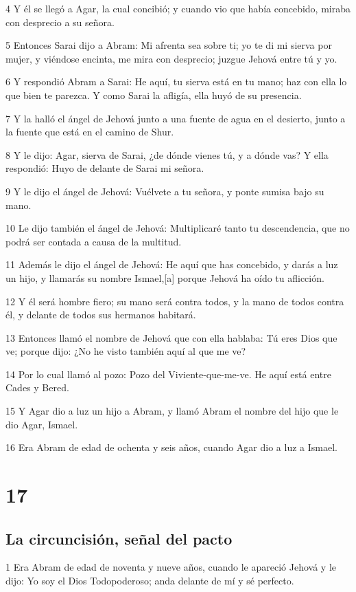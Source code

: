 4 Y él se llegó a Agar, la cual concibió; y cuando vio que había concebido, miraba con desprecio a su señora.

5 Entonces Sarai dijo a Abram: Mi afrenta sea sobre ti; yo te di mi sierva por mujer, y viéndose encinta, me mira con desprecio; juzgue Jehová entre tú y yo.

6 Y respondió Abram a Sarai: He aquí, tu sierva está en tu mano; haz con ella lo que bien te parezca. Y como Sarai la afligía, ella huyó de su presencia.

7 Y la halló el ángel de Jehová junto a una fuente de agua en el desierto, junto a la fuente que está en el camino de Shur.

8 Y le dijo: Agar, sierva de Sarai, ¿de dónde vienes tú, y a dónde vas? Y ella respondió: Huyo de delante de Sarai mi señora.

9 Y le dijo el ángel de Jehová: Vuélvete a tu señora, y ponte sumisa bajo su mano.

10 Le dijo también el ángel de Jehová: Multiplicaré tanto tu descendencia, que no podrá ser contada a causa de la multitud.

11 Además le dijo el ángel de Jehová: He aquí que has concebido, y darás a luz un hijo, y llamarás su nombre Ismael,[a] porque Jehová ha oído tu aflicción.

12 Y él será hombre fiero; su mano será contra todos, y la mano de todos contra él, y delante de todos sus hermanos habitará.

13 Entonces llamó el nombre de Jehová que con ella hablaba: Tú eres Dios que ve; porque dijo: ¿No he visto también aquí al que me ve?

14 Por lo cual llamó al pozo: Pozo del Viviente-que-me-ve. He aquí está entre Cades y Bered.

15 Y Agar dio a luz un hijo a Abram, y llamó Abram el nombre del hijo que le dio Agar, Ismael.

16 Era Abram de edad de ochenta y seis años, cuando Agar dio a luz a Ismael.

\chapter{17}

\section{La circuncisión, señal del pacto}

1 Era Abram de edad de noventa y nueve años, cuando le apareció Jehová y le dijo: Yo soy el Dios Todopoderoso; anda delante de mí y sé perfecto.

